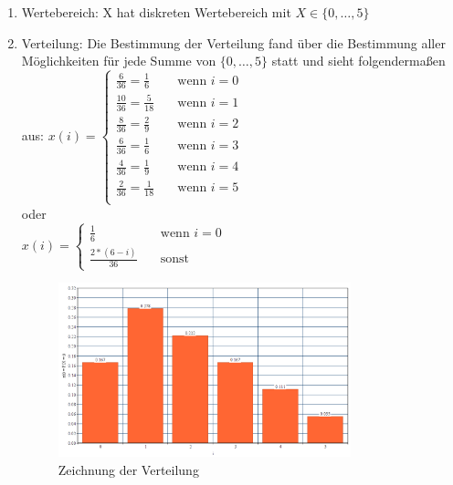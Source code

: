 \documentclass[%
10pt,              %
ngerman,           %
a4paper,           %
DIV11,             %
]{scrartcl}%
\begin{document}
\begin{enumerate}
	\item Wertebereich: X hat diskreten Wertebereich mit $X \in \{0, \dots, 5 \}$
	\item Verteilung: Die Bestimmung der Verteilung fand über die Bestimmung aller Möglichkeiten für jede Summe von $\{0, \dots, 5 \}$ statt und sieht folgendermaßen aus:\newline
	$x(i) =
    \begin{cases}
        \frac{6}{36} = \frac{1}{6} & \quad \text{wenn } i = 0\\
        \frac{10}{36} = \frac{5}{18} & \quad \text{wenn } i = 1\\
        \frac{8}{36} = \frac{2}{9} & \quad \text{wenn } i = 2\\
        \frac{6}{36} = \frac{1}{6} & \quad \text{wenn } i = 3\\
        \frac{4}{36} = \frac{1}{9} & \quad \text{wenn } i = 4\\
        \frac{2}{36} = \frac{1}{18} & \quad \text{wenn } i = 5\\
    \end{cases}
    $
    \\
    oder 
    \\
    $x(i) =
    \begin{cases}
        \frac{1}{6} & \quad \text{wenn } i = 0\\
        \frac{2 * (6 - i)}{36} & \quad \text{sonst }
    \end{cases}
    $ \\
     
    \begin{figure}[!htbp]
      \centering
        \caption{Zeichnung der Verteilung}
        \includegraphics[width=0.8\textwidth]{xdiff1vert}
    \end{figure}
	

\end{enumerate}
\end{document}
